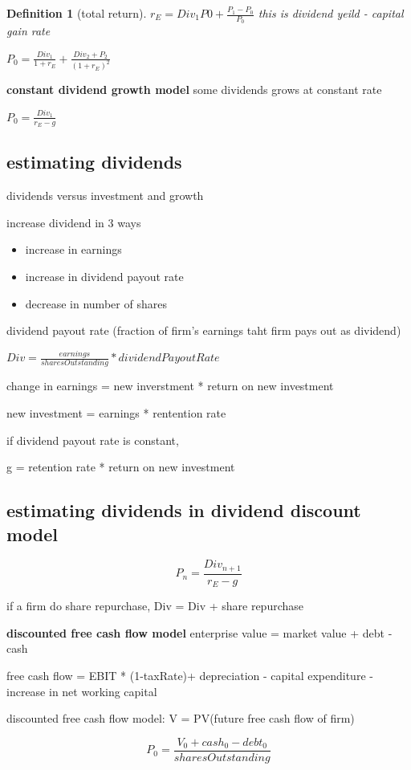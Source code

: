\documentclass[10pt]{article}
\theoremstyle{break}
\newtheorem{defn}{Definition}[subsection]
\begin{document}
\begin{defn}[total return]
    $r_E = {Div_1}{P0}+\frac{P_1-P_0}{P_0}$
    this is dividend yeild - capital gain rate
\end{defn}
    $P_0=\frac{Div_1}{1+r_E}+\frac{Div_2+P_2}{(1+r_E)^2}$

\textbf{constant dividend growth model} some dividends grows at constant rate 

$P_0=\frac{Div_1}{r_E - g}$

\subsection{estimating dividends}
dividends versus investment and growth 

increase dividend in 3 ways 
\begin{itemize}
    \item  increase in earnings 
    \item increase in dividend payout rate 
    \item decrease in number of shares
\end{itemize}

dividend payout rate (fraction of firm's earnings taht firm pays out as dividend)

$Div=\frac{earnings}{sharesOutstanding}* dividendPayoutRate$

change in earnings = new inverstment * return on new investment

new investment = earnings * rentention rate 

if dividend payout rate is constant,

g = retention rate * return on new investment 

\subsection{estimating dividends in dividend discount model}
$$P_n = \frac{Div_{n+1}}{r_E-g}$$

if a firm do share repurchase, Div = Div + share repurchase 

\textbf{discounted free cash flow model}
enterprise value = market value + debt - cash


free cash flow = EBIT * (1-taxRate)+ depreciation - capital expenditure - increase in net working capital

discounted free cash flow model: V = PV(future free cash flow of firm)

$$P_0=\frac{V_0+cash_0-debt_0}{sharesOutstanding}$$
\end{document}

